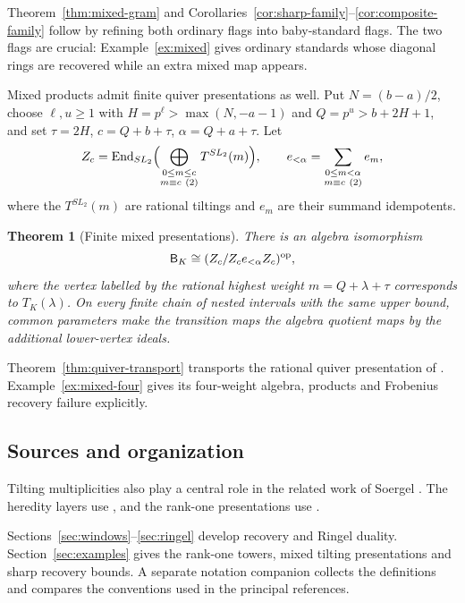 \documentclass[11pt,reqno]{amsart}
\newtheorem{theorem}{Theorem}[section]
\theoremstyle{definition}
\theoremstyle{remark}
\numberwithin{equation}{section}
\begin{document}
Theorem~\ref{thm:mixed-gram} and
Corollaries~\ref{cor:sharp-family}--\ref{cor:composite-family} follow
by refining both ordinary flags into baby-standard flags. The two
flags are crucial: Example~\ref{ex:mixed} gives ordinary standards
whose diagonal rings are recovered while an extra mixed map appears.

Mixed products admit finite quiver presentations as well. Put
$N=(b-a)/2$, choose $\ell,u\geq1$ with
$H=p^\ell>\max(N,-a-1)$ and $Q=p^u>b+2H+1$,
and set $\tau=2H$, $c=Q+b+\tau$, $\alpha=Q+a+\tau$. Let
\[
 Z_c=\End_{SL_2}\Bigl(
       \bigoplus_{\substack{0\leq m\leq c\\m\equiv c\ (2)}}
                      T^{SL_2}(m)\Bigr),\qquad
 e_{<\alpha}=\sum_{\substack{0\leq m<\alpha\\m\equiv c\ (2)}}e_m,
\]
where the $T^{SL_2}(m)$ are rational tiltings and $e_m$ are their
summand idempotents.

\begin{theorem}[Finite mixed presentations]\label{thm:intro-presentation}
There is an algebra isomorphism
\[
 \mathsf B_K\cong (Z_c/Z_ce_{<\alpha}Z_c)^{\mathrm{op}},
\]
where the vertex labelled by the rational highest weight
$m=Q+\lambda+\tau$ corresponds to $T_K(\lambda)$.
On every finite chain of nested intervals with the same upper bound,
common parameters make the transition maps the algebra quotient maps by
the additional lower-vertex ideals.
\end{theorem}

Theorem~\ref{thm:quiver-transport} transports the rational quiver
presentation of \cite{TW}. Example~\ref{ex:mixed-four} gives its
four-weight algebra, products and Frobenius recovery failure explicitly.

\subsection{Sources and organization}
Tilting multiplicities also
play a central role in the related work of Soergel \cite{Soergel}.
The heredity layers use \cite{Krause}, and the rank-one presentations
use \cite{TW,STWZ}.

Sections~\ref{sec:windows}--\ref{sec:ringel} develop recovery and
Ringel duality. Section~\ref{sec:examples} gives the rank-one towers,
mixed tilting presentations and sharp recovery bounds. A separate
notation companion collects the definitions and compares the
conventions used in the principal references.

\end{document}
